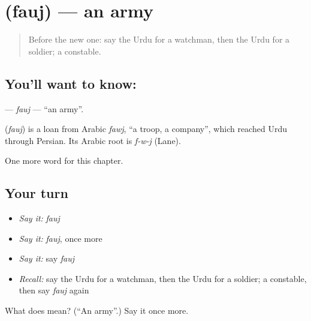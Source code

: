 \section[\texorpdfstring{\ur{فوج} (fauj)}{فوج (fauj)}]{ (fauj) — an army}

\label{lesson:UR-C237-fauj}



\begin{quote}
Before the new one: say the Urdu for a watchman, then the Urdu for a soldier; a constable.
\end{quote}

\subsection*{You'll want to know: }
\textbf{} — \emph{fauj} — \textquotedblleft{}an army\textquotedblright{}.

\begin{cousinweb}
\textbf{} (\emph{fauj}) is a loan from Arabic \emph{fawj}, \textquotedblleft{}a troop, a company\textquotedblright{}, which reached Urdu through Persian. Its Arabic root is \emph{f-w-j} (Lane).
\end{cousinweb}

\begin{grammarlens}[title={What you've built}]
One more word for this chapter.
\end{grammarlens}

\subsection*{Your turn}
\begin{itemize}
\raggedright
  \item \emph{Say it:} \emph{fauj}
  \item \emph{Say it:} \emph{fauj}, once more
  \item \emph{Say it:} say \emph{fauj}
  \item \emph{Recall:} say the Urdu for a watchman, then the Urdu for a soldier; a constable, then say \emph{fauj} again
\end{itemize}

\begin{tcolorbox}[breakable,colback=teal!4,colframe=teal!35!black,title={Before you move on}]
What does  mean? (\textquotedblleft{}An army\textquotedblright{}.) Say it once more.
\end{tcolorbox}
